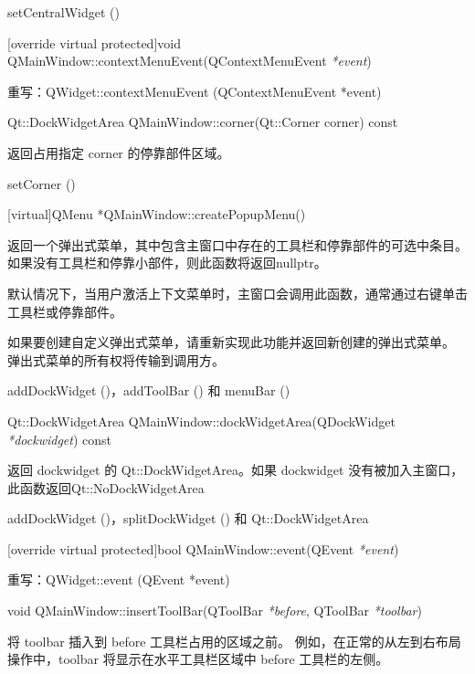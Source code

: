 \begin{seeAlso}
setCentralWidget ()
\end{seeAlso}

\splitLine

[override virtual protected]void QMainWindow::contextMenuEvent(QContextMenuEvent \emph{*event})

重写：QWidget::contextMenuEvent (QContextMenuEvent *event)

Qt::DockWidgetArea QMainWindow::corner(Qt::Corner corner) const

返回占用指定 corner 的停靠部件区域。

\begin{seeAlso}
setCorner ()
\end{seeAlso}

\splitLine

[virtual]QMenu *QMainWindow::createPopupMenu()

返回一个弹出式菜单，其中包含主窗口中存在的工具栏和停靠部件的可选中条目。如果没有工具栏和停靠小部件，则此函数将返回nullptr。

默认情况下，当用户激活上下文菜单时，主窗口会调用此函数，通常通过右键单击工具栏或停靠部件。

如果要创建自定义弹出式菜单，请重新实现此功能并返回新创建的弹出式菜单。
弹出式菜单的所有权将传输到调用方。

\begin{seeAlso}
addDockWidget ()，addToolBar () 和 menuBar ()
    \end{seeAlso}
    
\splitLine

Qt::DockWidgetArea QMainWindow::dockWidgetArea(QDockWidget \emph{*dockwidget}) const

返回 dockwidget 的 Qt::DockWidgetArea。如果 dockwidget 没有被加入主窗口，此函数返回Qt::NoDockWidgetArea

\begin{seeAlso}
addDockWidget ()，splitDockWidget () 和 Qt::DockWidgetArea
\end{seeAlso}

\splitLine

[override virtual protected]bool QMainWindow::event(QEvent \emph{*event})

重写：QWidget::event (QEvent *event)

\splitLine

void QMainWindow::insertToolBar(QToolBar \emph{*before}, QToolBar \emph{*toolbar})

将 toolbar 插入到 before 工具栏占用的区域之前。
例如，在正常的从左到右布局操作中，toolbar 将显示在水平工具栏区域中 before 工具栏的左侧。

